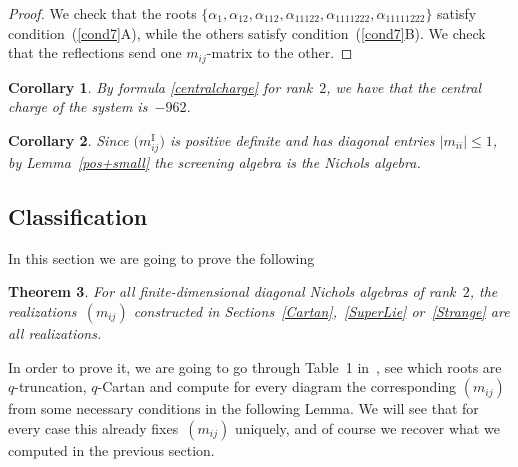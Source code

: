 \documentclass[pdftex]{sigma}%
\numberwithin{equation}{section}
\newtheorem{teo}{Theorem}[section]
\newtheorem{cor}[teo]{Corollary}
\begin{document}
\begin{proof}
We check that the roots $\lbrace \alpha_1{,} \alpha_{12}{,} \alpha_{112}{,} \alpha_{11122}{,} \alpha_{1111222}{,} \alpha_{11111222} \rbrace$ satisfy condi\-tion~(\ref{cond7}A), while the others satisfy condition~(\ref{cond7}B). We check that the reflections send one $m_{ij}$-matrix to the other.
\end{proof}

\begin{cor}By formula \eqref{centralcharge} for rank~$2$, we have that the central charge of the system is~$-962$.
\end{cor}

\begin{cor}Since $\big(m_{ij}^{\mathrm{I}}\big)$ is positive definite and has diagonal entries $|m_{ii}|\leq 1$, by Lem\-ma~{\rm \ref{pos+small}} the screening algebra is the Nichols algebra.
\end{cor}

\subsection{Classification}\label{Classification}
In this section we are going to prove the following
\begin{teo}\label{classifthm}
For all finite-dimensional diagonal Nichols algebras of rank~$2$, the realiza\-tions~$(m_{ij})$ constructed in Sections~{\rm \ref{Cartan}},~{\rm \ref{SuperLie}} or~{\rm \ref{Strange}} are all realizations.
\end{teo}

In order to prove it, we are going to go through Table~1 in~\cite{Hecklist}, see which roots are $q$-truncation, $q$-Cartan and compute for every diagram the corresponding $(m_{ij})$ from some necessary conditions in the following Lemma. We will see that for every case this already fixes~$(m_{ij})$ uniquely, and of course we recover what we computed in the previous section.
\end{document}
